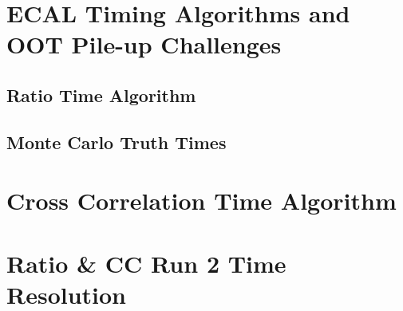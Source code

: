 \documentclass{cmspaper}
\begin{document}
\section{ECAL Timing Algorithms and OOT Pile-up Challenges \label{sec:motive}}


\subsection{Ratio Time Algorithm\label{sec:algos}}


\subsection{Monte Carlo Truth Times\label{sec:gen}}

\FloatBarrier

\section{Cross Correlation Time Algorithm\label{sec:algos}}


\pagebreak
\FloatBarrier

%

\appendix
\section {Ratio \& CC Run 2 Time Resolution\label{sec:results}}

\FloatBarrier

\pagebreak
\medskip
\printbibliography[heading=bibnumbered,title={References}] 

\end{document}
